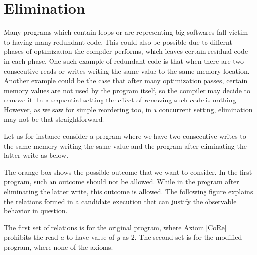 \section{Elimination}

    Many programs which contain loops or are representing big softwares fall victim to having many redundant code. 
    This could also be possible due to differnt phases of optimization the compiler performs, which leaves certain residual code in each phase.
    One such example of redundant code is that when there are two consecutive reads or writes writing the same value to the same memory location.
    Another example could be the case that after many optimization passes, certain memory values are not used by the program itself, so the compiler may decide to remove it.  
    In a sequential setting the effect of removing such code is nothing.
    However, as we saw for simple reordering too, in a concurrent setting, elimination may not be that straightforward. 
    
    Let us for instance consider a program where we have two consecutive writes to the same memory writing the same value and the program after eliminating the latter write as below. 


    
    The orange box shows the possible outcome that we want to consider. 
    In the first program, such an outcome should not be allowed. 
    While in the program after eliminating the latter write, this outcome is allowed.
    The following figure explains the relations formed in a candidate execution that can justify the observable behavior in question. 
    

    The first set of relations is for the original program, where Axiom \ref{CoRe} prohibits the read $a$ to have value of $y$ as $2$.
    The second set is for the modified program, where none of the axioms.
    
